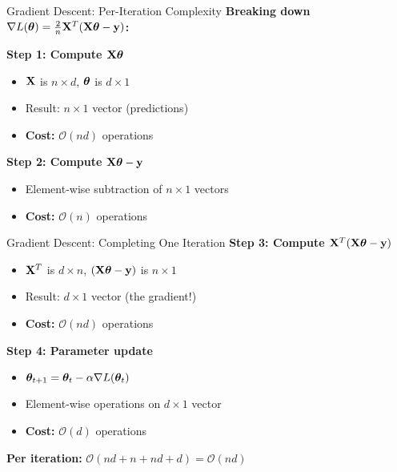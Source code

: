 \documentclass[usenames,dvipsnames]{beamer}
\begin{document}
  \begin{frame}{Gradient Descent: Per-Iteration Complexity}
    \textbf{Breaking down $\nabla L(\boldsymbol{\theta}) = \frac{2}{n}\mathbf{X}^T(\mathbf{X}\boldsymbol{\theta} - \mathbf{y})$:}
    
    \pause
    \textbf{Step 1: Compute $\mathbf{X}\boldsymbol{\theta}$}
    \begin{itemize}[<+->]
        \item $\mathbf{X}$ is $n \times d$, $\boldsymbol{\theta}$ is $d \times 1$
        \item Result: $n \times 1$ vector (predictions)
        \item \textbf{Cost:} $\mathcal{O}(nd)$ operations
    \end{itemize}
    
    \pause
    \textbf{Step 2: Compute $\mathbf{X}\boldsymbol{\theta} - \mathbf{y}$}
    \begin{itemize}[<+->]
        \item Element-wise subtraction of $n \times 1$ vectors
        \item \textbf{Cost:} $\mathcal{O}(n)$ operations
    \end{itemize}
  \end{frame}

  \begin{frame}{Gradient Descent: Completing One Iteration}
    \textbf{Step 3: Compute $\mathbf{X}^T(\mathbf{X}\boldsymbol{\theta} - \mathbf{y})$}
    
    \pause
    \begin{itemize}[<+->]
        \item $\mathbf{X}^T$ is $d \times n$, $(\mathbf{X}\boldsymbol{\theta} - \mathbf{y})$ is $n \times 1$
        \item Result: $d \times 1$ vector (the gradient!)
        \item \textbf{Cost:} $\mathcal{O}(nd)$ operations
    \end{itemize}
    
    \pause
    \textbf{Step 4: Parameter update}
    \begin{itemize}[<+->]
        \item $\boldsymbol{\theta}_{t+1} = \boldsymbol{\theta}_t - \alpha \nabla L(\boldsymbol{\theta}_t)$
        \item Element-wise operations on $d \times 1$ vector
        \item \textbf{Cost:} $\mathcal{O}(d)$ operations
    \end{itemize}
    
    \pause
    \begin{keypointsbox}{}
    \textbf{Per iteration:} $\mathcal{O}(nd + n + nd + d) = \mathcal{O}(nd)$
    \end{keypointsbox}
  \end{frame}
\end{document}
